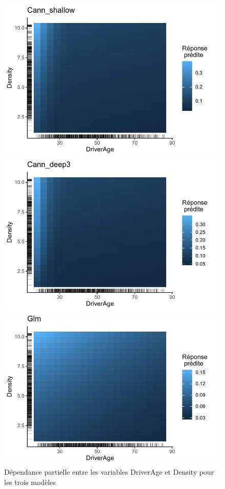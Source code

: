 \begin{figure}
\caption{\label{fig:inter3DriveDensity} Dépendance partielle entre les variables DriverAge et Density pour les trois modèles}
\centering
\begin{minipage}{0.45\linewidth}
\includegraphics[scale=0.6]{Graphiques/interDriverDensityShallow}
\end{minipage}
\hfill
\begin{minipage}{0.45\linewidth}
\includegraphics[scale=0.6]{Graphiques/interDriveDensityCann}
\end{minipage}
\hfill
\begin{minipage}{0.45\linewidth}
\includegraphics[scale=0.6]{Graphiques/interDriverDensityGlm}

\end{minipage}
\end{figure}
